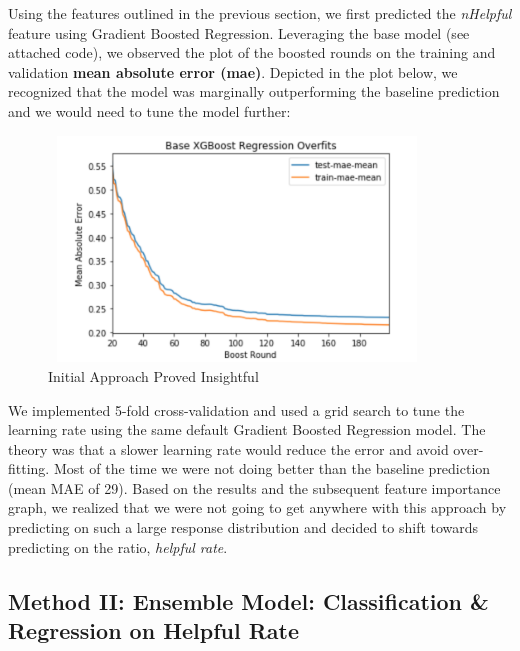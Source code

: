 \documentclass[12pt]{article}
\theoremstyle{plain}
\theoremstyle{definition}
\numberwithin{equation}{theorem}
\begin{document}
Using the features outlined in the previous section, we first predicted the \textit{nHelpful} feature using Gradient Boosted Regression. Leveraging the base model (see attached code), we observed the plot of the boosted rounds on the training and validation \textbf{mean absolute error (mae)}. Depicted in the plot below, we recognized that the model was marginally outperforming the baseline prediction and we would need to tune the model further:

\bigskip
\begin{figure}[ht]
\begin{center}
\includegraphics[width=10cm, height=6cm]{base_xgboost}
\caption{Initial Approach Proved Insightful}\label{Fig: XGboost Init}
\end{center}
\end{figure}

We implemented 5-fold cross-validation and used a grid search to tune the learning rate using the same default Gradient Boosted Regression model. The theory was that a slower learning rate would reduce the error and avoid over-fitting. Most of the time we were not doing better than the baseline prediction (mean MAE of 29). Based on the results and the subsequent feature importance graph, we realized that we were not going to get anywhere with this approach by predicting on such a large response distribution and decided to shift towards predicting on the ratio, \textit{helpful rate}.

\subsection{Method II: Ensemble Model: Classification \& Regression on Helpful Rate}
\end{document}
